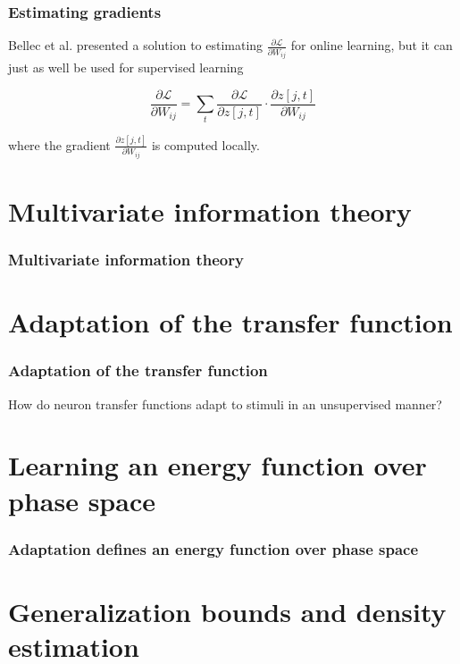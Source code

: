 \documentclass{beamer}
\begin{document}
\begin{frame}[plain]
\frametitle{Estimating gradients} 

Bellec et al. presented a solution to estimating $\frac{\partial\mathcal{L}}{\partial W_{ij}}$ for online learning, but it can just as well be used for supervised learning

\begin{equation*}
\frac{\partial\mathcal{L}}{\partial W_{ij}} = \sum_{t} \frac{\partial \mathcal{L}}{\partial z[j,t]} \cdot \frac{\partial z[j,t]}{\partial W_{ij}}
\end{equation*}

where the gradient $\frac{\partial z[j,t]}{\partial W_{ij}}$ is computed locally.




\end{frame}

\section{Multivariate information theory} 

\begin{frame}[plain]
\frametitle{Multivariate information theory} 
\end{frame}

\section{Adaptation of the transfer function} 

\begin{frame}[plain]
\frametitle{Adaptation of the transfer function} 
How do neuron transfer functions adapt to stimuli in an unsupervised manner?
\end{frame}

\section{Learning an energy function over phase space} 

\begin{frame}[plain]
\frametitle{Adaptation defines an energy function over phase space} 
\end{frame}

\section{Generalization bounds and density estimation} 
\end{document}
